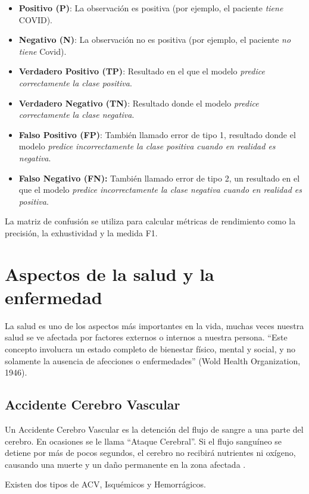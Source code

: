 \begin{itemize}
	\item \textbf{Positivo (P)}: La observación es positiva (por ejemplo, el paciente \textit{tiene} COVID).
	\item \textbf{Negativo (N)}: La observación no es positiva (por ejemplo, el paciente \textit{no tiene} Covid).
	\item \textbf{Verdadero Positivo (TP)}: Resultado en el que el modelo \textit{predice correctamente la clase positiva}.
	\item \textbf{Verdadero Negativo (TN)}: Resultado donde el modelo \textit{predice correctamente la clase negativa}.
	\item \textbf{Falso Positivo (FP)}: También llamado error de tipo 1, resultado donde el modelo \textit{predice incorrectamente la clase positiva cuando en realidad es negativa}.
	\item \textbf{Falso Negativo (FN):} También llamado error de tipo 2, un resultado en el que el modelo \textit{predice incorrectamente la clase negativa cuando en realidad es positiva}.
\end{itemize}

\par La matriz de confusión se utiliza para calcular métricas de rendimiento como la precisión, la exhustividad y la medida F1.

\doublespacing
\section{Aspectos de la salud y la enfermedad}
La salud es uno de los aspectos más importantes en la vida, muchas veces nuestra salud se ve afectada por factores externos o internos a nuestra persona. “Este concepto involucra un estado completo de bienestar físico, mental y social, y no solamente la ausencia de afecciones o enfermedades” (Wold Health Organization, 1946).  \\

\doublespacing
\subsection{Accidente Cerebro Vascular}
\par Un Accidente Cerebro Vascular es la detención del flujo de sangre a una parte del cerebro. En ocasiones se le llama “Ataque Cerebral”. Si el flujo sanguíneo se detiene por más de pocos segundos, el cerebro no recibirá nutrientes ni oxígeno, causando una muerte y un daño permanente en la zona afectada \cite{Garcia2019}.
\par Existen dos tipos de ACV, Isquémicos y Hemorrágicos.\\

